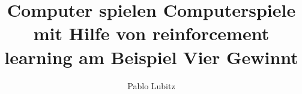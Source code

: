 \documentclass[bachelor,german]{hgbthesis}
\title{Computer spielen Computerspiele mit Hilfe von reinforcement learning am Beispiel Vier Gewinnt}
\author{Pablo Lubitz}
\begin{document}

\frontmatter                    %

\maketitle
\tableofcontents

		
			

\mainmatter          %








\appendix                                            %


\MakeBibliography                        %



\end{document}
